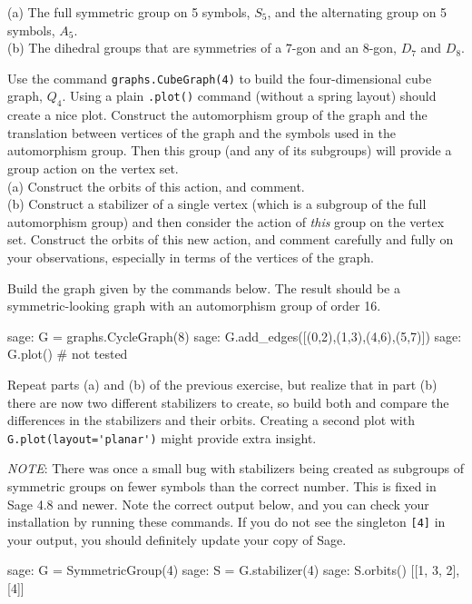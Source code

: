 (a) The full symmetric group on 5 symbols, $S_5$, and the alternating group on 5 symbols, $A_5$.\\
(b) The dihedral groups that are symmetries of a $7$-gon and an $8$-gon, $D_{7}$ and $D_{8}$.
\begin{sageverbatim}\end{sageverbatim}
%
%
Use the command \verb?graphs.CubeGraph(4)? to build the four-dimensional cube graph, $Q_4$.  Using a plain \verb?.plot()? command (without a spring layout) should create a nice plot.  Construct the automorphism group of the graph and the translation between vertices of the graph and the symbols used in the automorphism group.  Then this group (and any of its subgroups) will provide a group action on the vertex set.\\
%
(a) Construct the orbits of this action, and comment.\\
(b) Construct a stabilizer of a single vertex (which is a subgroup of the full automorphism group) and then consider the action of \emph{this} group on the vertex set.  Construct the orbits of this new action, and comment carefully and fully on your observations, especially in terms of the vertices of the graph.
\begin{sageverbatim}\end{sageverbatim}
%
%
Build the graph given by the commands below.  The result should be a symmetric-looking graph with an automorphism group of order 16.
%
%
\begin{sageexample}
sage: G = graphs.CycleGraph(8)
sage: G.add_edges([(0,2),(1,3),(4,6),(5,7)])
sage: G.plot()                  # not tested
\end{sageexample}
%
Repeat parts (a) and (b) of the previous exercise, but realize that in part (b) there are now two different stabilizers to create, so build both and compare the differences in the stabilizers and their orbits.  Creating a second plot with \verb?G.plot(layout='planar')? might provide extra insight.\par
%
\emph{NOTE}: There was once a small bug with stabilizers being created as subgroups of symmetric groups on fewer symbols than the correct number.  This is fixed in Sage 4.8 and newer.  Note the correct output below, and you can check your installation by running these commands.  If you do not see the singleton \verb?[4]? in your output, you should definitely update your copy of Sage.
%
\begin{sageexample}
sage: G = SymmetricGroup(4)
sage: S = G.stabilizer(4)
sage: S.orbits()
[[1, 3, 2], [4]]
\end{sageexample}
%

